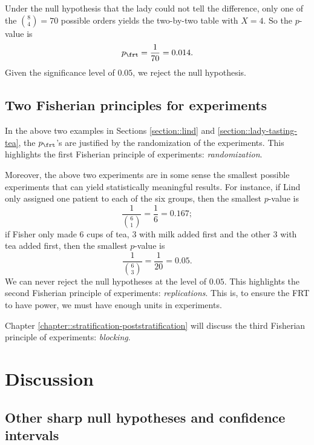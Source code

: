 Under the null hypothesis that the lady could not tell the difference, only one of the $\binom{8}{4} = 70$ possible orders yields the two-by-two table with $X=4$. So the $p$-value is
$$
p_\frt = \frac{1}{70} = 0.014.
$$
Given the significance level of $0.05$, we reject the null hypothesis. 



\subsection{Two Fisherian principles for experiments}\label{sec::fisherian-principles-experiments}


In the above two examples in Sections \ref{section::lind} and \ref{section::lady-tasting-tea}, the $p_\frt$'s are justified by the randomization of the experiments. This highlights the first Fisherian principle of experiments: {\it randomization}.




 
 
 


Moreover, the above two experiments are in some sense the smallest possible experiments that can yield statistically meaningful results. For instance, if Lind only assigned one patient to each of the six groups, then the smallest $p$-value is
$$
\frac{1}{\binom{6}{1}}  =\frac{1}{6} = 0.167;
$$
if Fisher only made $6$ cups of tea, $3$ with milk added first and the other $3$ with tea added first, then the smallest $p$-value is
$$
\frac{1}{\binom{6}{3}} = \frac{1}{20} = 0.05.
$$
We can never reject the null hypotheses at the level of $0.05$. This highlights the second Fisherian principle of experiments: {\it replications}. This is, to ensure the FRT to have power, we must have enough units in experiments. 

 

Chapter \ref{chapter::stratification-poststratification} will discuss the third Fisherian principle of experiments: {\it blocking}.


 

 

\section{Discussion}

\subsection{Other sharp null hypotheses and confidence intervals}\label{sec::frt-invert-interval}


